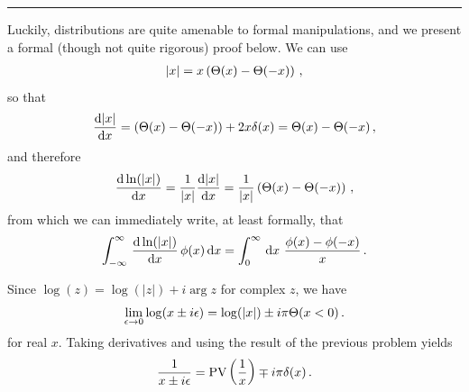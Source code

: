\vspace{10pt}
\hrule
\vspace{10pt}


Luckily, distributions are quite amenable to formal manipulations, and we present a formal (though not quite rigorous) proof below.
%
We can use
\begin{align}
    \abs{x}
    =
    x\left(\Theta(x)-\Theta(-x)\right)
    \,,
\end{align}
so that
\begin{align}
    \dv{\abs{x}}{x}
    =
    \left(\Theta(x)-\Theta(-x)\right)
    +
    2 x \delta(x)
    =
    \Theta(x)-\Theta(-x)
    \,,
\end{align}
and therefore
\begin{align}
    \dv{\ln(\abs{x})}{x}
    =
    \frac{1}{\abs{x}}\dv{\abs{x}}{x}
    =
    \frac{1}{\abs{x}}
    \left(
        \Theta(x)-\Theta(-x)
    \right)
    \,,
\end{align}
from which we can immediately write, at least formally, that
\begin{align}
    \int_{-\infty}^\infty
    \,
    \dv{\ln(\abs{x})}{x}
    \,
    \phi(x)
    \,
    \dd x
    =
    \int_0^\infty
    \,
    \dd x
    \,\,
    \frac{\phi(x) - \phi(-x)}{x}
    \,.
\end{align}





Since \(\log(z) = \log(|z|) + i \arg{z}\) for complex \(z\), we have
\begin{align}
    \lim_{\epsilon \to 0}
    \log(x \pm i \epsilon)
    =
    \log(\abs{x}) \pm i \pi \Theta(x < 0)
    \,.
\end{align}
for real \(x\).
%
Taking derivatives and using the result of the previous problem yields
\begin{align}
    \frac{1}{x \pm i \epsilon}
    =
    \text{PV}\left(\frac{1}{x}\right)
    \mp
    i\pi \delta(x)
    \,.
\end{align}





